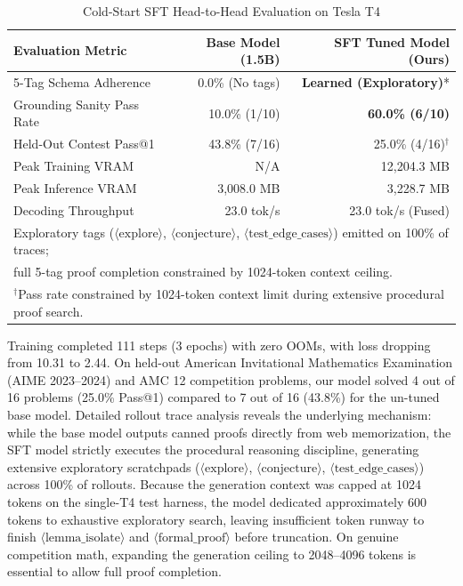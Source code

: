 \documentclass[10pt,twocolumn,letterpaper]{article}
\begin{document}
\begin{table}[h]
\centering
\caption{Cold-Start SFT Head-to-Head Evaluation on Tesla T4}
\label{tab:sft_eval}
\small
\begin{tabular}{lrr}
\toprule
Evaluation Metric & Base Model (1.5B) & SFT Tuned Model (Ours) \\
\midrule
5-Tag Schema Adherence      & 0.0\% (No tags)       & \textbf{Learned (Exploratory)}* \\
Grounding Sanity Pass Rate  & 10.0\% (1/10)         & \textbf{60.0\% (6/10)} \\
Held-Out Contest Pass@1     & 43.8\% (7/16)         & 25.0\% (4/16)$^\dagger$ \\
Peak Training VRAM          & N/A                   & 12,204.3 MB \\
Peak Inference VRAM         & 3,008.0 MB            & 3,228.7 MB \\
Decoding Throughput         & 23.0 tok/s            & 23.0 tok/s (Fused) \\
\bottomrule
\multicolumn{3}{l}{\footnotesize *Exploratory tags ($\langle\text{explore}\rangle$, $\langle\text{conjecture}\rangle$, $\langle\text{test\_edge\_cases}\rangle$) emitted on 100\% of traces;} \\
\multicolumn{3}{l}{\footnotesize full 5-tag proof completion constrained by 1024-token context ceiling.} \\
\multicolumn{3}{l}{\footnotesize $^\dagger$Pass rate constrained by 1024-token context limit during extensive procedural proof search.}
\end{tabular}
\end{table}

Training completed 111 steps (3 epochs) with zero OOMs, with loss dropping from 10.31 to 2.44. On held-out American Invitational Mathematics Examination (AIME 2023--2024) and AMC 12 competition problems, our model solved 4 out of 16 problems (25.0\% Pass@1) compared to 7 out of 16 (43.8\%) for the un-tuned base model. Detailed rollout trace analysis reveals the underlying mechanism: while the base model outputs canned proofs directly from web memorization, the SFT model strictly executes the procedural reasoning discipline, generating extensive exploratory scratchpads ($\langle\text{explore}\rangle$, $\langle\text{conjecture}\rangle$, $\langle\text{test\_edge\_cases}\rangle$) across 100\% of rollouts. Because the generation context was capped at 1024 tokens on the single-T4 test harness, the model dedicated approximately 600 tokens to exhaustive exploratory search, leaving insufficient token runway to finish $\langle\text{lemma\_isolate}\rangle$ and $\langle\text{formal\_proof}\rangle$ before truncation. On genuine competition math, expanding the generation ceiling to 2048--4096 tokens is essential to allow full proof completion.
\end{document}
